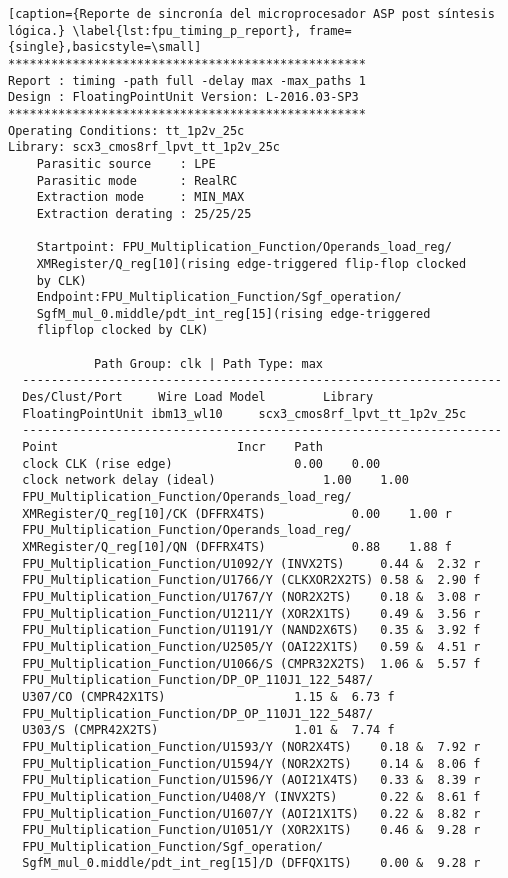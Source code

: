 \begin{lstlisting}[caption={Reporte de sincronía del microprocesador ASP post síntesis lógica.} \label{lst:fpu_timing_p_report}, frame={single},basicstyle=\small]
**************************************************
Report : timing -path full -delay max -max_paths 1
Design : FloatingPointUnit Version: L-2016.03-SP3
**************************************************
Operating Conditions: tt_1p2v_25c
Library: scx3_cmos8rf_lpvt_tt_1p2v_25c
	Parasitic source    : LPE
	Parasitic mode      : RealRC
	Extraction mode     : MIN_MAX
	Extraction derating : 25/25/25
	
    Startpoint: FPU_Multiplication_Function/Operands_load_reg/
    XMRegister/Q_reg[10](rising edge-triggered flip-flop clocked
    by CLK)
    Endpoint:FPU_Multiplication_Function/Sgf_operation/
    SgfM_mul_0.middle/pdt_int_reg[15](rising edge-triggered 
    flipflop clocked by CLK)
    
    		Path Group: clk | Path Type: max
  -------------------------------------------------------------------
  Des/Clust/Port     Wire Load Model       	Library
  FloatingPointUnit	ibm13_wl10     scx3_cmos8rf_lpvt_tt_1p2v_25c
  -------------------------------------------------------------------
  Point							Incr	Path
  clock CLK (rise edge)					0.00	0.00
  clock network delay (ideal)				1.00	1.00
  FPU_Multiplication_Function/Operands_load_reg/
  XMRegister/Q_reg[10]/CK (DFFRX4TS)			0.00	1.00 r
  FPU_Multiplication_Function/Operands_load_reg/
  XMRegister/Q_reg[10]/QN (DFFRX4TS)			0.88	1.88 f
  FPU_Multiplication_Function/U1092/Y (INVX2TS)		0.44 &	2.32 r
  FPU_Multiplication_Function/U1766/Y (CLKXOR2X2TS)	0.58 &	2.90 f
  FPU_Multiplication_Function/U1767/Y (NOR2X2TS)	0.18 &	3.08 r
  FPU_Multiplication_Function/U1211/Y (XOR2X1TS)	0.49 &	3.56 r
  FPU_Multiplication_Function/U1191/Y (NAND2X6TS)	0.35 &	3.92 f
  FPU_Multiplication_Function/U2505/Y (OAI22X1TS)	0.59 &	4.51 r
  FPU_Multiplication_Function/U1066/S (CMPR32X2TS)	1.06 &	5.57 f
  FPU_Multiplication_Function/DP_OP_110J1_122_5487/
  U307/CO (CMPR42X1TS)					1.15 &	6.73 f
  FPU_Multiplication_Function/DP_OP_110J1_122_5487/
  U303/S (CMPR42X2TS)					1.01 &	7.74 f
  FPU_Multiplication_Function/U1593/Y (NOR2X4TS)	0.18 &	7.92 r
  FPU_Multiplication_Function/U1594/Y (NOR2X2TS)	0.14 &	8.06 f
  FPU_Multiplication_Function/U1596/Y (AOI21X4TS)	0.33 &	8.39 r
  FPU_Multiplication_Function/U408/Y (INVX2TS)		0.22 &	8.61 f
  FPU_Multiplication_Function/U1607/Y (AOI21X1TS)	0.22 &	8.82 r
  FPU_Multiplication_Function/U1051/Y (XOR2X1TS)	0.46 &	9.28 r
  FPU_Multiplication_Function/Sgf_operation/
  SgfM_mul_0.middle/pdt_int_reg[15]/D (DFFQX1TS)	0.00 &	9.28 r
  

\end{lstlisting}
